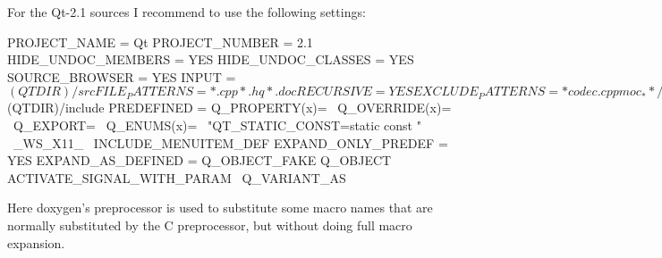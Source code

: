 For the Qt-\/2.1 sources I recommend to use the following settings: \begin{DoxyVerb}
PROJECT_NAME          = Qt
PROJECT_NUMBER        = 2.1
HIDE_UNDOC_MEMBERS    = YES
HIDE_UNDOC_CLASSES    = YES
SOURCE_BROWSER        = YES
INPUT                 = $(QTDIR)/src
FILE_PATTERNS         = *.cpp *.h q*.doc
RECURSIVE             = YES
EXCLUDE_PATTERNS      = *codec.cpp moc_* */compat/* */3rdparty/*
ALPHABETICAL_INDEX    = YES
COLS_IN_ALPHA_INDEX   = 3
IGNORE_PREFIX         = Q
ENABLE_PREPROCESSING  = YES
MACRO_EXPANSION       = YES
INCLUDE_PATH          = $(QTDIR)/include
PREDEFINED            = Q_PROPERTY(x)= \
                        Q_OVERRIDE(x)= \
                        Q_EXPORT= \
                        Q_ENUMS(x)= \
                        "QT_STATIC_CONST=static const " \
                        _WS_X11_ \
                        INCLUDE_MENUITEM_DEF
EXPAND_ONLY_PREDEF    = YES
EXPAND_AS_DEFINED     = Q_OBJECT_FAKE Q_OBJECT ACTIVATE_SIGNAL_WITH_PARAM \
                        Q_VARIANT_AS
\end{DoxyVerb}


Here doxygen's preprocessor is used to substitute some macro names that are normally substituted by the C preprocessor, but without doing full macro expansion. 